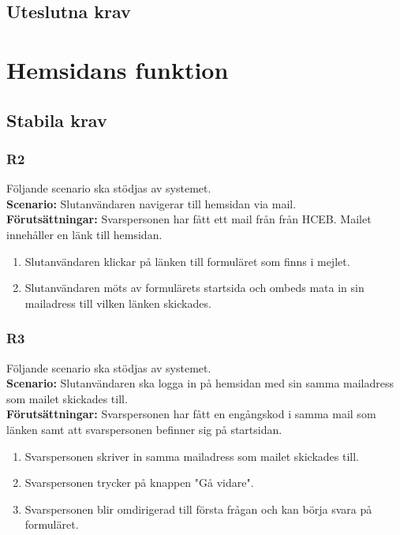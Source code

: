 \documentclass{article}
\begin{document}
    \subsection*{Uteslutna krav}
    
    \section{Hemsidans funktion}
    
    \subsection*{Stabila krav}
    
      \subsubsection*{R2}
    Följande scenario ska stödjas av systemet.
        \\
       \indent \textbf{Scenario:} Slutanvändaren navigerar till hemsidan via mail.
        \\
       \indent \textbf{Förutsättningar:} Svarspersonen har fått ett mail från från HCEB. Mailet innehåller en länk till hemsidan.
            \begin{enumerate}
                \item Slutanvändaren klickar på länken till formuläret som finns i mejlet.
                \item Slutanvändaren möts av formulärets startsida och ombeds mata in sin mailadress till vilken länken skickades. 
            \end{enumerate}
            
        \subsubsection*{R3}
    Följande scenario ska stödjas av systemet.
        \\
       \indent \textbf{Scenario:} Slutanvändaren ska logga in på hemsidan med sin samma mailadress som mailet skickades till.
        \\
       \indent \textbf{Förutsättningar:} Svarspersonen har fått en engångskod i samma mail som länken samt att svarspersonen befinner sig på startsidan.
            \begin{enumerate}
               \item Svarspersonen skriver in samma mailadress som mailet skickades till.
               \item Svarspersonen trycker på knappen "Gå vidare".
                \item  Svarspersonen blir omdirigerad till första frågan och kan börja svara på formuläret.
            \end{enumerate}
   
\end{document}
